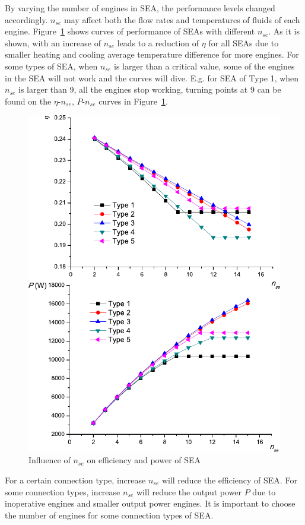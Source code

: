 By varying the number of engines in SEA, the performance levels changed accordingly. $n_{se}$ may affect both the flow rates and temperatures of fluids of each engine. Figure~\ref{fig:n_se} shows curves of performance of SEAs with different $n_{se}$. As it is shown, with an increase of $n_{se}$ leads to a reduction of $\eta$ for all SEAs due to smaller heating and cooling average temperature difference for more engines. For some types of SEA, when $n_{se}$ is larger than a critical value, some of the engines in the SEA will not work and the curves will dive. E.g. for SEA of Type 1, when $n_{se}$ is larger than 9, all the engines stop working, turning points at 9 can be found on the $\eta$-$n_{se}$, $P$-$n_{se}$ curves in Figure~\ref{fig:n_se}.

\noindent \begin{figure}[htbp]
\begin{center}
	\includegraphics[width = 0.7\columnwidth]{fig/n_se}
	\caption{Influence of $n_{se}$ on efficiency and power of SEA}
	\label{fig:n_se}
\end{center}
\end{figure}

For a certain connection type, increase $n_{se}$ will reduce the efficiency of SEA. For some connection types, increase $n_{se}$ will reduce the output power $P$ due to inoperative engines and smaller output power engines. It is important to choose the number of engines for some connection types of SEA. 

